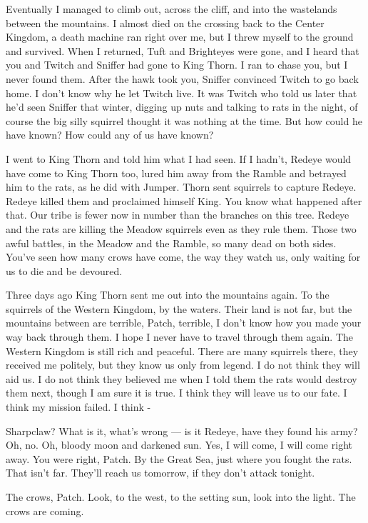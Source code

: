 \documentclass[12pt]{book}
\begin{document}
Eventually I managed to climb out, across the cliff, and into the wastelands between the mountains. I almost died on the crossing back to the Center Kingdom, a death machine ran right over me, but I threw myself to the ground and survived. When I returned, Tuft and Brighteyes were gone, and I heard that you and Twitch and Sniffer had gone to King Thorn. I ran to chase you, but I never found them. After the hawk took you, Sniffer convinced Twitch to go back home. I don't know why he let Twitch live. It was Twitch who told us later that he'd seen Sniffer that winter, digging up nuts and talking to rats in the night, of course the big silly squirrel thought it was nothing at the time. But how could he have known? How could any of us have known?

I went to King Thorn and told him what I had seen. If I hadn't, Redeye would have come to King Thorn too, lured him away from the Ramble and betrayed him to the rats, as he did with Jumper. Thorn sent squirrels to capture Redeye. Redeye killed them and proclaimed himself King. You know what happened after that. Our tribe is fewer now in number than the branches on this tree. Redeye and the rats are killing the Meadow squirrels even as they rule them. Those two awful battles, in the Meadow and the Ramble, so many dead on both sides. You've seen how many crows have come, the way they watch us, only waiting for us to die and be devoured.

Three days ago King Thorn sent me out into the mountains again. To the squirrels of the Western Kingdom, by the waters. Their land is not far, but the mountains between are terrible, Patch, terrible, I don't know how you made your way back through them. I hope I never have to travel through them again. The Western Kingdom is still rich and peaceful. There are many squirrels there, they received me politely, but they know us only from legend. I do not think they will aid us. I do not think they believed me when I told them the rats would destroy them next, though I am sure it is true. I think they will leave us to our fate. I think my mission failed. I think -

Sharpclaw? What is it, what's wrong ---
is it Redeye, have they found his army? Oh, no. Oh, bloody moon and darkened sun. Yes, I will come, I will come right away. You were right, Patch. By the Great Sea, just where you fought the rats. That isn't far. They'll reach us tomorrow, if they don't attack tonight.

The crows, Patch. Look, to the west, to the setting sun, look into the light. The crows are coming.
\end{document}
